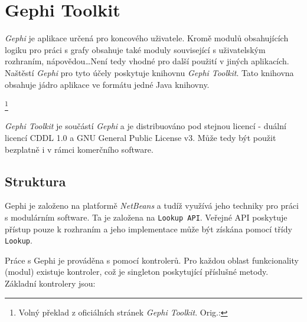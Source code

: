\documentclass[thesis=M,czech]{FITthesis}[2014/05/6]
\begin{document}
\section{Gephi Toolkit}
\textit{Gephi} je aplikace určená pro koncového uživatele. Kromě modulů obsahujících logiku pro práci s grafy obsahuje také moduly související s uživatelským
rozhraním, nápovědou\ldots Není tedy vhodné pro další použití v jiných aplikacích. Naštěstí \textit{Gephi} pro tyto účely poskytuje knihovnu \textit{Gephi Toolkit}.
Tato knihovna obsahuje jádro aplikace ve formátu jedné Java knihovny.

\textit{}\footnote{Volný překlad z oficiálních stránek \textit{Gephi Toolkit}\cite{gephi:toolkit}. Orig.:
}

\textit{Gephi Toolkit} je součástí \textit{Gephi} a je distribuováno pod stejnou licencí - duální licencí CDDL 1.0 a GNU General Public License v3.
Může tedy být použit bezplatně i v rámci komerčního software.

\subsection{Struktura}
Gephi je založeno na platformě \textit{NetBeans} a tudíž využívá jeho techniky pro práci s modulárním software. Ta je založena na 
\texttt{Lookup API}. Veřejné API poskytuje přístup pouze k rozhraním a jeho implementace může být získána pomocí třídy \texttt{Lookup}.



Práce s Gephi je prováděna s pomocí kontrolerů. Pro každou oblast funkcionality (modul) existuje kontroler, což je 
singleton poskytující příslušné metody. Základní kontrolery jsou:
\end{document}
